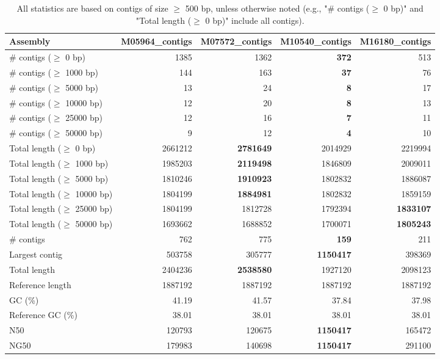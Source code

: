 \documentclass[12pt,a4paper]{article}
\begin{document}
\begin{table}[ht]
\begin{center}
\caption{All statistics are based on contigs of size $\geq$ 500 bp, unless otherwise noted (e.g., "\# contigs ($\geq$ 0 bp)" and "Total length ($\geq$ 0 bp)" include all contigs).}
\begin{tabular}{|l*{4}{|r}|}
\hline
Assembly & M05964\_contigs & M07572\_contigs & M10540\_contigs & M16180\_contigs \\ \hline
\# contigs ($\geq$ 0 bp) & 1385 & 1362 & {\bf 372} & 513 \\ \hline
\# contigs ($\geq$ 1000 bp) & 144 & 163 & {\bf 37} & 76 \\ \hline
\# contigs ($\geq$ 5000 bp) & 13 & 24 & {\bf 8} & 17 \\ \hline
\# contigs ($\geq$ 10000 bp) & 12 & 20 & {\bf 8} & 13 \\ \hline
\# contigs ($\geq$ 25000 bp) & 12 & 16 & {\bf 7} & 11 \\ \hline
\# contigs ($\geq$ 50000 bp) & 9 & 12 & {\bf 4} & 10 \\ \hline
Total length ($\geq$ 0 bp) & 2661212 & {\bf 2781649} & 2014929 & 2219994 \\ \hline
Total length ($\geq$ 1000 bp) & 1985203 & {\bf 2119498} & 1846809 & 2009011 \\ \hline
Total length ($\geq$ 5000 bp) & 1810246 & {\bf 1910923} & 1802832 & 1886087 \\ \hline
Total length ($\geq$ 10000 bp) & 1804199 & {\bf 1884981} & 1802832 & 1859159 \\ \hline
Total length ($\geq$ 25000 bp) & 1804199 & 1812728 & 1792394 & {\bf 1833107} \\ \hline
Total length ($\geq$ 50000 bp) & 1693662 & 1688852 & 1700071 & {\bf 1805243} \\ \hline
\# contigs & 762 & 775 & {\bf 159} & 211 \\ \hline
Largest contig & 503758 & 305777 & {\bf 1150417} & 398369 \\ \hline
Total length & 2404236 & {\bf 2538580} & 1927120 & 2098123 \\ \hline
Reference length & 1887192 & 1887192 & 1887192 & 1887192 \\ \hline
GC (\%) & 41.19 & 41.57 & 37.84 & 37.98 \\ \hline
Reference GC (\%) & 38.01 & 38.01 & 38.01 & 38.01 \\ \hline
N50 & 120793 & 120675 & {\bf 1150417} & 165472 \\ \hline
NG50 & 179983 & 140698 & {\bf 1150417} & 291100 \\ \hline

\end{tabular}
\end{center}
\end{table}
\end{document}
